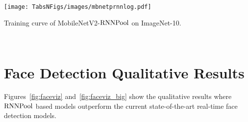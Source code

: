 \documentclass[10pt]{article}
\newcommand{\rpool}{\ensuremath{{\rm RNNPool}}\xspace}
\begin{document}
\begin{table}[h!]
  \centering
  \begin{minipage}[t]{0.45\columnwidth}
    \texttt{[image: TabsNFigs/images/mbnetprnnlog.pdf]}
    \vspace{-18pt}
    \caption{\small Training curve of MobileNetV2-\rpool on ImageNet-10.}
    \label{fig:log}
  \end{minipage}
  \hfill
  ~
  \begin{minipage}[t]{0.50\columnwidth}
  \centering
  \scriptsize
    \vspace{-78pt}
    \caption{\small Ablation over RNN cell in \rpool for MobileNetV2-\rpool on ImageNet-10.}
    \label{tab:otherrnn}
  \end{minipage}
  \vspace{-17pt}
\end{table}  \section{Face Detection Qualitative Results}
\label{sec:facedetviz}
Figures~\ref{fig:faceviz} and~\ref{fig:faceviz_big} show the
qualitative results where \rpool based models outperform the current
state-of-the-art real-time face detection models.
\end{document}
